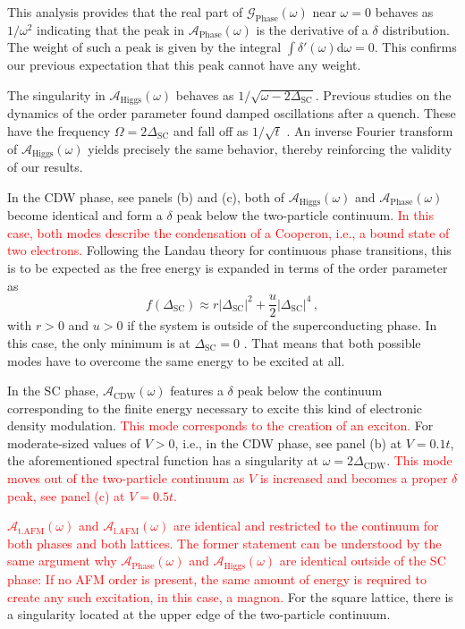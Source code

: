 \documentclass[
    reprint, 
    aps,
    preprintnumbers,
    twocolumn,
    prb,
    superscriptaddress
]{revtex4-2}
\newcommand{\greens}[1]{\mathcal{G}_\text{#1} (\omega)}
\newcommand{\spectral}[1]{\mathcal{A}_\text{#1}  (\omega)}
\begin{document}
This analysis provides that the real part of $\greens{Phase}$ near $\omega=0$ behaves as $1/\omega^2$ indicating that the peak in $\spectral{Phase}$ is the derivative of a $\delta$ distribution.
The weight of such a peak is given by the integral $\int \delta'(\omega) \mathrm{d}\omega = 0$.
This confirms our previous expectation that this peak cannot have any weight.

The singularity in $\spectral{Higgs}$ behaves as $1/\sqrt{\omega - 2 \Delta_\text{SC}}$.
Previous studies on the dynamics of the order parameter found damped oscillations after a quench.
These have the frequency $\Omega = 2 \Delta_\text{SC}$ and fall off as $1/\sqrt{t}$ \cite{Volkov73,Kulik1981,Yuzbashyan06}.
An inverse Fourier transform of $\spectral{Higgs}$ yields precisely the same behavior, thereby reinforcing the validity of our results.

In the CDW phase, see panels (b) and (c), both of $\spectral{Higgs}$ and $\spectral{Phase}$ become identical and form a $\delta$ peak below the two-particle continuum.
\textcolor{red}{In this case, both modes describe the condensation of a Cooperon, i.e., a bound state of two electrons.}
Following the Landau theory for continuous phase transitions, this is to be expected as the free energy is expanded in terms of the order parameter as
\begin{equation}
    f(\Delta_\text{SC}) \approx r |\Delta_\text{SC}|^2 + \frac{u}{2} |\Delta_\text{SC}|^4\,,
\end{equation}
with $r > 0$ and $u > 0$ if the system is outside of the superconducting phase. 
In this case, the only minimum is at $\Delta_\text{SC} = 0$ \cite{Coleman2015}. 
That means that both possible modes have to overcome the same energy to be excited at all. 

In the SC phase, $\spectral{CDW}$ features a $\delta$ peak below the continuum corresponding to the finite energy necessary to excite this kind of electronic density modulation.
\textcolor{red}{This mode corresponds to the creation of an exciton.}
For moderate-sized values of $V>0$, i.e., in the CDW phase, see panel (b) at $V=0.1t$, the aforementioned spectral function has a singularity at $\omega=2\Delta_\text{CDW}$.%
\textcolor{red}{This mode moves out of the two-particle continuum as $V$ is increased and becomes a proper $\delta$ peak, see panel (c) at $V=0.5t$.}

\textcolor{red}{$\spectral{t.AFM}$ and $\spectral{l.AFM}$ are identical and restricted to the continuum for both phases and both lattices.
The former statement can be understood by the same argument why $\spectral{Phase}$ and $\spectral{Higgs}$ are identical outside of the SC phase:
If no AFM order is present, the same amount of energy is required to create any such excitation, in this case, a magnon.}
For the square lattice, there is a singularity located at the upper edge of the two-particle continuum.
\end{document}
